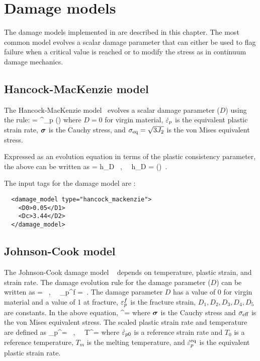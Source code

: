 \chapter{Damage models} \label{ch:damage}
The damage models implemented in \Vaango are described in this chapter.  The
most common model evolves a scalar damage parameter that can either be
used to flag failure when a critical value is reached or to modify the
stress as in continuum damage mechanics.

\section{Hancock-MacKenzie model}
The Hancock-MacKenzie model~\cite{Hancock1976} evolves a scalar damage parameter ($D$)
using the rule:
\Beq
   =  \dot{\Veps}^\Teq_p \exp\left(\frac{\Tr(\Bsig)}{2\sigma_{\Teff}}\right)
\Eeq
where $ D = 0 $ for virgin material, $ \dot{\varepsilon}_p $ is the 
equivalent plastic strain rate, $\boldsymbol{\sigma}$ is the Cauchy stress, and
$\sigma_{\text{eq}} = \sqrt{3J_2}$ is the von Mises equivalent stress.

Expressed as an evolution equation in terms of the plastic consistency parameter, the 
above can be written as
\Beq
   = \dot{\lambda} h_D ~,~~
  h_D =  \exp\left(\frac{\Tr(\Bsig)}{2\sigma_{\Teff}}\right) \,.
\Eeq

The input tags for the damage model are :
\lstset{language=XML}
\begin{lstlisting}
  <damage_model type="hancock_mackenzie">
    <D0>0.05</D1>
    <Dc>3.44</D2>
  </damage_model>
\end{lstlisting}

\section{Johnson-Cook model}
The Johnson-Cook damage model ~\cite{Johnson1985} depends on temperature, plastic
strain, and strain rate.
The damage evolution rule for the damage parameter ($D$) can be written as
\Beq
   =  ~,~~
  \Veps_p^f = 
    \,.
\Eeq
The damage parameter $D$ has a value of 0 for virgin material
and a value of 1 at fracture, $\varepsilon_p^f$ is the fracture strain, 
$D_1, D_2, D_3, D_4, D_5$ are constants.
In the above equation,
\Beq
  \sigma^\star= \frac{\Tr(\Bsig)}{3\sigma_{\Teff}}
\Eeq
where $\boldsymbol{\sigma}$ is the Cauchy stress and $\sigma_{\text{eff}}$ is the von Mises equivalent stress.
The scaled plastic strain rate and temperature are defined as
\Beq
 \dot{\Veps}_p^\star =  ~,~~
 T^\star = 
\Eeq
where $\dot{\varepsilon}_{p0}$ is a reference strain rate and $T_0$ is a reference temperature,
$T_m$ is the melting temperature, and $\dot{\varepsilon}^{\text{eq}}_p$ is the equivalent plastic strain rate.

